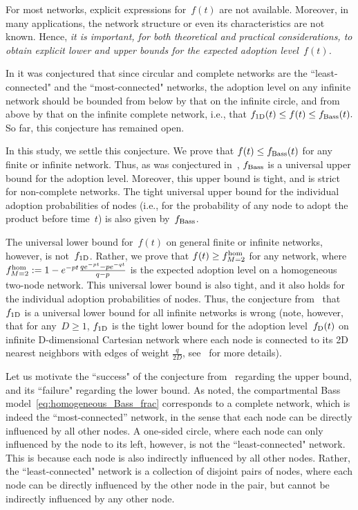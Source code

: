 \documentclass[review]{elsarticle}
\begin{document}
 
  
For most networks,  explicit expressions for~$f(t)$ are not available. Moreover,
in many applications, the network structure or even its characteristics are not known. Hence, {\em it is important, for both theoretical and practical considerations, to obtain explicit lower and upper bounds for the expected adoption level~$f(t)$.} 


In \cite{OR-10} it was conjectured that since circular and complete networks are the ``least-connected" and the ``most-connected" networks, the adoption level on any infinite network should be bounded from below by that on the infinite circle, and from above by that on the infinite complete network, i.e., that
$
f_{\rm 1D}(t)\leq f(t) \leq f_{\rm Bass}(t). 
$
So far, this conjecture has remained open.


In this study, we settle this conjecture. We 
prove that $f(t)\leq f_{\rm Bass}(t)$ for any finite or infinite network.
Thus, as was conjectured in~\cite{OR-10},  $f_{\rm Bass}$ is a universal upper bound for the adoption level.
Moreover, this upper bound is tight, and is strict for non-complete networks. The tight universal upper bound for 
the individual adoption probabilities of nodes
(i.e., for the probability of any node to adopt the product before time~$t$)
is also given by~$f_{\rm Bass}$.
 
The universal lower bound for~$f(t)$ on general finite or infinite networks, however, is not~$f_{\rm 1D}$. Rather, we prove that $f(t)\geq f_{M=2}^{\rm hom}$ 
for any network,
where~$f^{\rm hom}_{M=2}:= 1-e^{-pt}\frac{qe^{-pt}-pe^{-qt}}{q-p}$ is the expected adoption level on a homogeneous two-node network. 
This universal lower bound is also tight, and it also holds for the individual adoption probabilities of nodes. Thus, the conjecture from~\cite{OR-10} that~$f_{\rm 1D}$ is a universal lower bound for all infinite networks is wrong
(note, however, that for any~$D \ge 1$, $f_{\rm 1D}$ is the tight lower bound for the adoption level~$f_{\rm D}(t)$ on infinite D-dimensional Cartesian network 
where each node is connected to its 2D nearest neighbors with edges of weight $\frac{q}{2D}$, 
see~\cite{Funnel2022} for more details).

Let us motivate the ``success" of the conjecture from~\cite{OR-10} regarding the upper bound, and its ``failure" regarding the lower bound. As noted, the compartmental Bass model~\eqref{eq:homogeneous_Bass_frac} corresponds to a complete network, which is indeed the ``most-connected'' network, in the sense that each node can be  directly influenced by all other nodes. A one-sided circle, where each node can only influenced by the node to its left, however, is not the ``least-connected" network. This is because each node is also indirectly influenced by all other nodes. Rather, the ``least-connected" network is a  collection of disjoint pairs of nodes, where each node can be directly influenced by the other node in the pair, but cannot be indirectly influenced by any other node.
\end{document}
